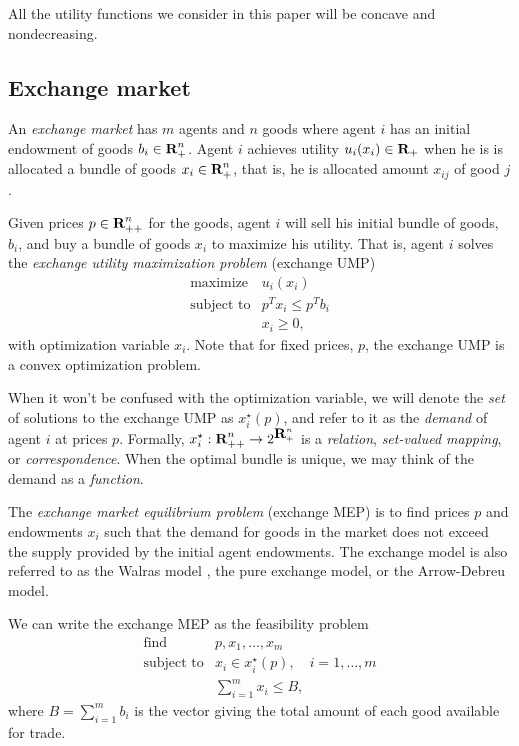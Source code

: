 \documentclass[12pt]{article}
\begin{document}
All the utility functions we consider in this paper will
be concave and nondecreasing.

\subsection{Exchange market}
An \emph{exchange market} has $m$ agents and $n$ goods where
agent $i$ has an initial endowment of goods $b_i \in {\mbox{\bf R}}_+^n$.
Agent $i$ achieves utility $u_i(x_i) \in {\mbox{\bf R}}_+$ when he is is allocated a
bundle of goods $x_i \in {\mbox{\bf R}}^n_{+}$,
that is, he is allocated amount $x_{ij}$ of good $j$.

Given prices $p \in {\mbox{\bf R}}^n_{++}$ for the goods, agent $i$ will sell his
initial bundle of goods, $b_i$, and buy a bundle of goods
$x_i$ to maximize his utility.
That is, agent $i$ solves the \emph{exchange utility maximization problem} (exchange UMP)
\begin{equation}
\label{p-ump}
\begin{array}{ll}
\mbox{maximize} & u_i(x_i) \\
\mbox{subject to} & p^T x_i \leq p^T b_i \\
& x_i \geq 0,
\end{array}
\end{equation}
with optimization variable $x_i$. Note that for fixed prices, $p$, the exchange UMP is a convex optimization problem.

When it won't be confused with the optimization variable,
we will denote the \emph{set} of solutions to the exchange UMP as $x^\star_i(p)$,
and refer to it as the \emph{demand} of agent $i$ at prices $p$.
Formally, $x_i^\star : {\mbox{\bf R}}^n_{++} \to 2^{{\mbox{\bf R}}^n_+}$ is a
\emph{relation}, \emph{set-valued mapping}, or \emph{correspondence}.
When the optimal bundle is unique, we may think of
the demand as a \emph{function}.

The \emph{exchange market equilibrium problem} (exchange MEP) is to find prices $p$ and endowments $x_i$
such that the demand for goods in the market does not exceed the supply
provided by the initial agent endowments.
The exchange model is also referred to as the Walras model \cite{walras1896elements},
the pure exchange model, or the Arrow-Debreu model.

We can write the exchange MEP as the feasibility problem
\begin{equation}
\label{p-mep}
\begin{array}{ll}
\mbox{find} & p, x_1, \ldots, x_m \\
\mbox{subject to} & x_i \in x_i^\star(p),\quad i = 1,\ldots, m \\
& \sum_{i=1}^m x_i \leq B,
\end{array}
\end{equation}
where $B = \sum_{i=1}^m b_i$ is the vector giving the total amount of each good
available for trade.
\end{document}
